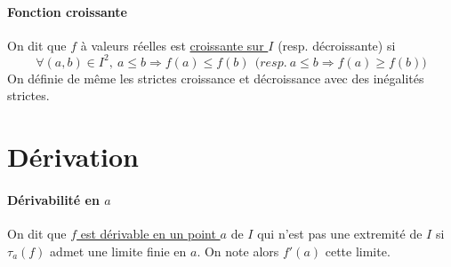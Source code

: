 		\paragraph{Fonction croissante} On dit que $f$ à valeurs réelles est \underline{croissante sur $I$} (resp. décroissante) si 
		\[\forall (a,b) \in I^2 ,~a\leq b\Rightarrow f(a)\leq f(b) ~~ \big(resp. ~a\leq b\Rightarrow f(a) \geq f(b) \big) \]
		On définie de même les strictes croissance et décroissance avec des inégalités strictes. \trait
	\section{Dérivation}
		\traitd
		\paragraph{Dérivabilité en $a$}
			On dit que \underline{$f$ est dérivable en un point $a$} de $I$ qui n'est pas une extremité de $I$ si $\tau_a(f)$ admet une limite 
			finie en $a$. On note alors $f'(a)$ cette limite.\trait ${}$\vspace*{-1.4cm} \traitd
